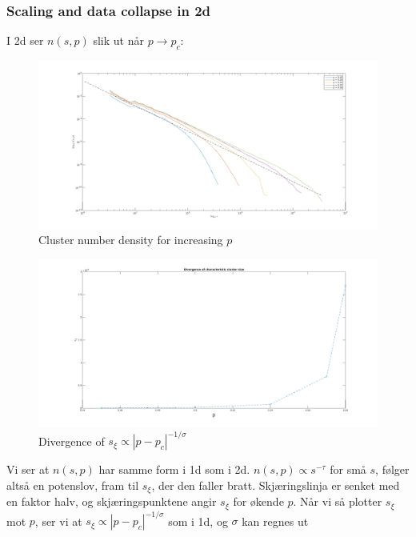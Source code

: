\documentclass[english, a4paper]{article}
\begin{document}
\subsubsection{Scaling and data collapse in 2d}
I 2d ser $n(s,p)$ slik ut når $p \to p_c$:
\begin{figure}[H]
  \begin{center}
  \includegraphics[width = 140mm]{../Figures/scalingClusterSize512.png}
  \caption{Cluster number density for increasing $p$}
  \label{fig:fig9}
  \end{center}
\end{figure}
\begin{figure}[H]
  \begin{center}
  \includegraphics[width = 140mm]{../Figures/charClusterSizeDivergence.png}
  \caption{Divergence of $s_\xi \propto |p-p_c|^{-1/\sigma}$}
  \label{fig:fig10}
  \end{center}
\end{figure}
Vi ser at $n(s,p)$ har samme form i 1d som i 2d. $n(s,p) \propto s^{-\tau}$ for små $s$,
følger altså en potenslov, fram til $s_\xi$, der den faller bratt. Skjæringslinja
er senket med en faktor halv, og skjæringspunktene angir $s_\xi$ for økende $p$. Når vi så plotter
$s_\xi$ mot $p$, ser vi at $s_\xi \propto |p-p_c|^{-1/\sigma}$ som i 1d, og $\sigma$ kan regnes ut
\end{document}
